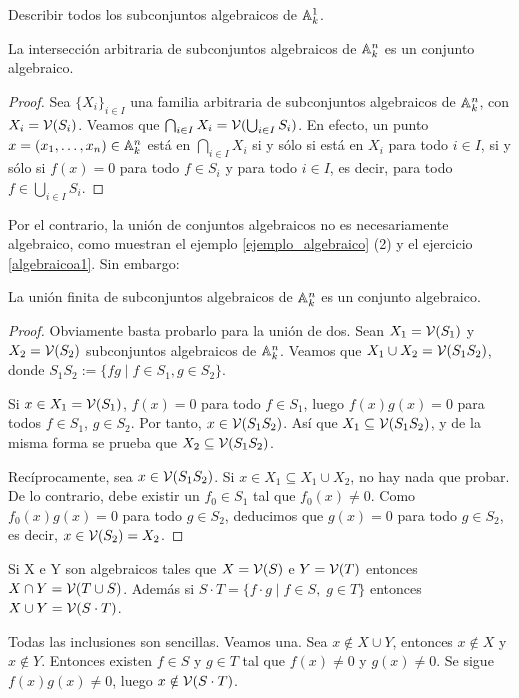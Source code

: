 \documentclass[ACGA.tex]{subfiles}
\begin{document}
\begin{ejer}\label{algebraicoa1} Describir todos los subconjuntos algebraicos de $\mathbb{A}^1_k$.
 
\end{ejer}

\begin{prop}\label{interseccion} La intersección arbitraria de subconjuntos algebraicos de $\mathbb{A}^n_k$ es un conjunto algebraico.
 
\end{prop}

\begin{proof}
 Sea $\{X_i\}_{i\in I}$ una familia arbitraria de subconjuntos algebraicos de $\mathbb{A}^n_k$, con $X_i=\mathcal{V}(S_i)$. Veamos que $\bigcap_{i\in I}X_i=\mathcal{V}(\bigcup_{i\in I} S_i)$. En efecto, un punto $x=(x_1,\ldots,x_n)\in\mathbb{A}^n_k$ está en $\bigcap_{i\in I}X_i$ si y sólo si está en $X_i$ para todo $i\in I$, si y sólo si $f(x)=0$ para todo $f\in S_i$ y para todo $i\in I$, es decir, para todo $f\in \bigcup_{i\in I} S_i$.
\end{proof}

Por el contrario, la unión de conjuntos algebraicos no es necesariamente algebraico, como muestran el ejemplo \ref{ejemplo_algebraico} (2) y el ejercicio \ref{algebraicoa1}. Sin embargo:

\begin{prop}\label{union} La unión finita de subconjuntos algebraicos de $\mathbb{A}^n_k$ es un conjunto algebraico.
 
\end{prop}

\begin{proof}
 Obviamente basta probarlo para la unión de dos. Sean $X_1=\mathcal{V}(S_1)$ y $X_2=\mathcal{V}(S_2)$ subconjuntos algebraicos de $\mathbb{A}^n_k$. Veamos que $X_1\cup X_2=\mathcal{V}(S_1S_2)$, donde $S_1S_2:=\{fg \mid f\in S_1,g\in S_2\}$.

Si $x\in X_1=\mathcal{V}(S_1)$, $f(x)=0$ para todo $f\in S_1$, luego $f(x)g(x)=0$ para todos $f\in S_1$, $g\in S_2$. Por tanto, $x\in \mathcal{V}(S_1S_2)$. Así que $X_1\subseteq \mathcal{V}(S_1S_2)$, y de la misma forma se prueba que $X_2\subseteq \mathcal{V}(S_1S_2)$. 

Recíprocamente, sea $x\in \mathcal{V}(S_1S_2)$. Si $x\in X_1\subseteq X_1\cup X_2$, no hay nada que probar. De lo contrario, debe existir un $f_0\in S_1$ tal que $f_0(x)\neq 0$. Como $f_0(x)g(x)=0$ para todo $g\in S_2$, deducimos que $g(x)=0$ para todo $g\in S_2$, es decir, $x\in \mathcal{V}(S_2)=X_2$.
\end{proof}

\begin{prop}
Si X e Y son algebraicos tales que $X=\mathcal{V}(S)$ e $Y=\mathcal{V}(T)$ entonces $X\cap Y = \mathcal{V}(T\cup S)$. Además si $S\cdot T = \{f\cdot g \mid f \in S,\; g \in T\}$ entonces $X\cup Y = \mathcal{V}(S\cdot T)$. 
\end{prop}
\begin{dem}
Todas las inclusiones son sencillas. Veamos una. Sea $x\notin X\cup Y$, entonces $x\notin X$ y $x\notin Y$. Entonces existen $f\in S$ y $g\in T$ tal que $f(x)\neq 0$ y $g(x)\neq 0$. Se sigue $f(x)g(x)\neq 0$, luego $x\notin \mathcal{V}(S\cdot T)$. \QED
\end{dem}
\end{document}
